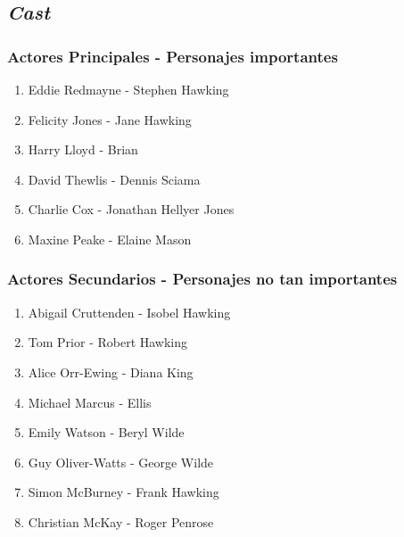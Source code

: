 \documentclass[a5paper, 11pt]{article}
\begin{document}
    \subsection{\emph{\normalsize{Cast}}}
    
    \small{
    
        \subsubsection{Actores Principales - Personajes importantes}
        
             \begin{enumerate}[1.]
    
                \item Eddie Redmayne - Stephen Hawking
                \item Felicity Jones - Jane Hawking
                \item Harry Lloyd - Brian
                \item David Thewlis - Dennis Sciama
                \item Charlie Cox - Jonathan Hellyer Jones
                \item Maxine Peake - Elaine Mason
    
            \end{enumerate}
    
        \subsubsection{Actores Secundarios - Personajes no tan importantes}
        
        \begin{enumerate}[1.]
    
                \item Abigail Cruttenden - Isobel Hawking
                \item Tom Prior - Robert Hawking
                \item Alice Orr-Ewing - Diana King
                \item Michael Marcus - Ellis
                \item Emily Watson - Beryl Wilde
                \item Guy Oliver-Watts - George Wilde
                \item Simon McBurney - Frank Hawking
                \item Christian McKay - Roger Penrose
    
            \end{enumerate}
        
}
\end{document}
